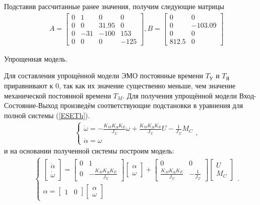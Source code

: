 \documentclass[a4paper,12pt]{article} %
\begin{document}
Подставив рассчитанные ранее значения, получим следующие матрицы
\begin{align}
	&&A = 
	\begin{bmatrix}
		0 & 1 & 0 & 0\\
		0 & 0 & 31.95 & 0\\
		0 & -31 & -100 & 153\\
		0 & 0 & 0 & -125
	\end{bmatrix}, B =
	\begin{bmatrix}
		0 & 0\\
		0 & -103.09\\
		0 & 0\\
		812.5 & 0
	\end{bmatrix}
\end{align}

Упрощенная модель.\par
Для составления упрощённой модели ЭМО постоянные времени $T_\text{У}$ и $T_\text{Я}$ приравнивают к 0, так как их значение существенно меньше, чем значение механической постоянной времени $T_M$. Для получения упрощённой модели Вход-Состояние-Выход произведём соответствующие подстановки в уравнения для полной системы (\ref{ESETh}).
\begin{align}
	&&\begin{cases}
		\dot{\omega} = -\displaystyle{\frac{K_MK_\text{Д}K_E}{J_\Sigma}}\omega + \frac{K_MK_\text{Д}K_E}{J_\Sigma}U - \frac{1}{J_\Sigma}M_C\\
		\dot{\alpha} = \omega
	\end{cases},
\end{align}
и на основании полученной системы построим модель:
\begin{align}
	&&\begin{cases}
		\begin{bmatrix}
			\dot{\alpha}\\
			\dot{\omega}
		\end{bmatrix} =
		\begin{bmatrix}
			0 & 1\\
			0 & -\displaystyle{\frac{K_MK_\text{Д}K_E}{J_\Sigma}}
		\end{bmatrix}
		\begin{bmatrix}
			\alpha\\
			\omega
		\end{bmatrix} + 
		\begin{bmatrix}
			0 & 0\\
			\displaystyle{\frac{K_MK_\text{Д}K_E}{J_\Sigma}} & -\displaystyle{\frac{1}{J_\Sigma}}
		\end{bmatrix}
		\begin{bmatrix}
			U\\
			M_C
		\end{bmatrix}\\
		\alpha =
		\begin{bmatrix}
			1 & 0
		\end{bmatrix}
		\begin{bmatrix}
			\alpha\\
			\omega
		\end{bmatrix}
	\end{cases}.
\end{align}
	
\end{document}
